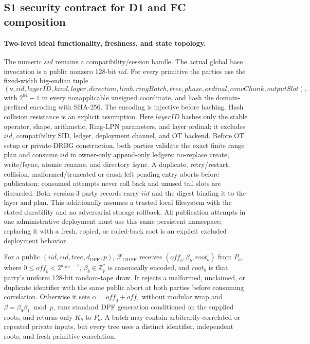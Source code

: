 \documentclass[11pt]{article}
\newcommand{\Z}{\mathbb{Z}}
\newcommand{\dpfd}{d_{\mathrm{DPF}}} %
\begin{document}
\subsection{S1 security contract for D1 and FC composition}
\label{sec:s1contract}

\paragraph{Two-level ideal functionality, freshness, and state topology.}
The numeric $\mathit{sid}$ remains a compatibility/session handle.  The actual
global base invocation is a public nonzero 128-bit $\mathit{iid}$.  For every
primitive the parties use the fixed-width big-endian tuple
\[
(\mathsf{v},\mathit{iid},\mathit{layerID},\mathit{kind},\mathit{layer},
\mathit{direction},\mathit{limb},\mathit{ringBatch},\mathit{tree},
\mathit{phase},\mathit{ordinal},\mathit{convChunk},\mathit{outputSlot}),
\]
with $2^{64}-1$ in every nonapplicable unsigned coordinate, and hash the
domain-prefixed encoding with SHA-256.  The encoding is injective before
hashing.  Hash collision resistance is an explicit assumption.
Here $\mathit{layerID}$ hashes only the stable operator, shape, arithmetic,
Ring-LPN parameters, and layer ordinal; it excludes $\mathit{iid}$,
compatibility SID, ledger, deployment channel, and OT backend.
Before OT setup or private-DRBG construction, both parties validate the exact
finite range plan and consume $\mathit{iid}$ in owner-only append-only ledgers:
no-replace create, write/fsync, atomic rename, and directory fsync.  A
duplicate, retry/restart, collision, malformed/truncated or crash-left pending
entry aborts before publication; consumed attempts never roll back and unused
tail slots are discarded.  Both version-3 party records carry $\mathit{iid}$
and the digest binding it to the layer and plan.  This additionally assumes a
trusted local filesystem with the stated durability and no adversarial storage
rollback. All publication attempts in one administrative deployment must use
this same persistent namespace; replacing it with a fresh, copied, or
rolled-back root is an explicit excluded deployment behavior.

For a public $(\mathit{iid},\mathit{cid},\mathit{tree},\dpfd,p)$,
$\mathcal F_{\mathrm{DDPF}}$ receives
$(\mathit{off}_b,\beta_b,\mathit{root}_b)$ from $P_b$, where
$0\leq\mathit{off}_b<2^{\dpfd-1}$, $\beta_b\in\Z_p^*$ is canonically
encoded, and $\mathit{root}_b$ is that party's uniform 128-bit random-tape
draw. It rejects a malformed, unclaimed, or duplicate identifier with the same
public abort at both parties before consuming correlation. Otherwise it sets
$\alpha=\mathit{off}_0+\mathit{off}_1$ without modular wrap and
$\beta=\beta_0\beta_1\bmod p$, runs standard DPF generation conditioned on
the supplied roots, and returns only $K_b$ to $P_b$. A batch may contain
arbitrarily correlated or repeated private inputs, but every tree uses a
distinct identifier, independent roots, and fresh primitive correlation.
\end{document}

